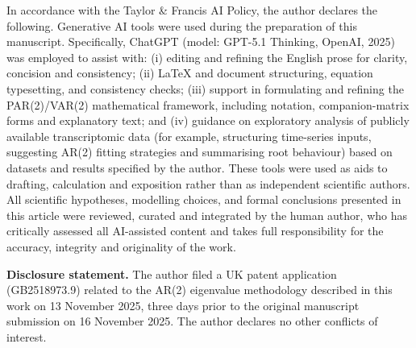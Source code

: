 \documentclass[]{interact}
\begin{document}
In accordance with the Taylor \& Francis AI Policy, the author declares the
following.
Generative AI tools were used during the preparation of this manuscript.
Specifically, ChatGPT (model: GPT-5.1 Thinking, OpenAI, 2025) was employed to
assist with: (i) editing and refining the English prose for clarity, concision
and consistency; (ii) \LaTeX{} and document structuring, equation typesetting,
and consistency checks; (iii) support in formulating and refining the
PAR(2)/VAR(2) mathematical framework, including notation, companion-matrix
forms and explanatory text; and (iv) guidance on exploratory analysis of
publicly available transcriptomic data (for example, structuring time-series
inputs, suggesting AR(2) fitting strategies and summarising root behaviour)
based on datasets and results specified by the author.
These tools were used as aids to drafting, calculation and exposition rather
than as independent scientific authors.
All scientific hypotheses, modelling choices, and formal conclusions presented
in this article were reviewed, curated and integrated by the human author, who
has critically assessed all AI-assisted content and takes full responsibility
for the accuracy, integrity and originality of the work.

\bigskip
\noindent\textbf{Disclosure statement.}
The author filed a UK patent application (GB2518973.9) related to the
AR(2) eigenvalue methodology described in this work on 13 November 2025,
three days prior to the original manuscript submission on 16 November 2025.
The author declares no other conflicts of interest.
\end{document}
